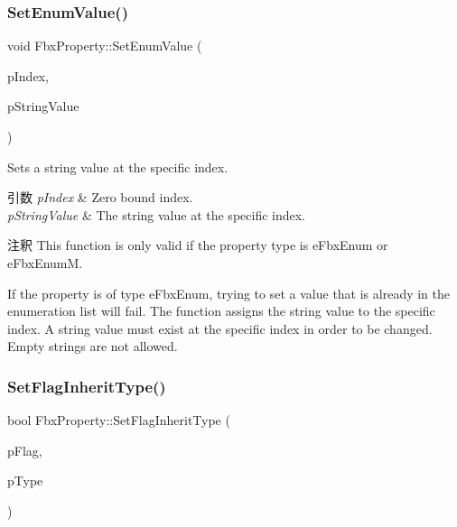 \subsubsection{\texorpdfstring{Set\+Enum\+Value()}{SetEnumValue()}}
{\footnotesize\ttfamily void Fbx\+Property\+::\+Set\+Enum\+Value (\begin{DoxyParamCaption}\item[{int}]{p\+Index,  }\item[{const char $\ast$}]{p\+String\+Value }\end{DoxyParamCaption})}

Sets a string value at the specific index. 
\begin{DoxyParams}{引数}
{\em p\+Index} & Zero bound index. \\
\hline
{\em p\+String\+Value} & The string value at the specific index. \\
\hline
\end{DoxyParams}
\begin{DoxyRemark}{注釈}
This function is only valid if the property type is e\+Fbx\+Enum or e\+Fbx\+EnumM. 

If the property is of type e\+Fbx\+Enum, trying to set a value that is already in the enumeration list will fail. The function assigns the string value to the specific index. A string value must exist at the specific index in order to be changed. Empty strings are not allowed. 
\end{DoxyRemark}
\mbox{\label{class_fbx_property_a65a521dab6bcd5c3f2570f555dbcaddc}} 
\subsubsection{\texorpdfstring{Set\+Flag\+Inherit\+Type()}{SetFlagInheritType()}}
{\footnotesize\ttfamily bool Fbx\+Property\+::\+Set\+Flag\+Inherit\+Type (\begin{DoxyParamCaption}\item[{\hyperlink{class_fbx_property_flags_afabfa7e0949aac8a7dcdf8a141867e99}{Fbx\+Property\+Flags\+::\+E\+Flags}}]{p\+Flag,  }\item[{\hyperlink{class_fbx_property_flags_ae3b667a4fcac4b827fa186a698fec2f8}{Fbx\+Property\+Flags\+::\+E\+Inherit\+Type}}]{p\+Type }\end{DoxyParamCaption})}

